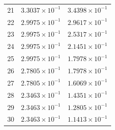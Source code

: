 \begin{table}[H]
\begin{tabular}{@{}rrr@{}}
21 & $3.3037\times10^{-1}$ & $3.4398\times10^{-1}$\\
22 & $2.9975\times10^{-1}$ & $2.9617\times10^{-1}$\\
23 & $2.9975\times10^{-1}$ & $2.5317\times10^{-1}$\\
24 & $2.9975\times10^{-1}$ & $2.1451\times10^{-1}$\\
25 & $2.9975\times10^{-1}$ & $1.7978\times10^{-1}$\\
26 & $2.7805\times10^{-1}$ & $1.7978\times10^{-1}$\\
27 & $2.7805\times10^{-1}$ & $1.6069\times10^{-1}$\\
28 & $2.3463\times10^{-1}$ & $1.4351\times10^{-1}$\\
29 & $2.3463\times10^{-1}$ & $1.2805\times10^{-1}$\\
30 & $2.3463\times10^{-1}$ & $1.1413\times10^{-1}$\\
\bottomrule
\end{tabular}
\end{table}

